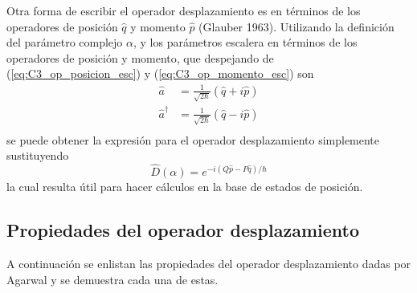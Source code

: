 Otra forma de escribir el operador desplazamiento es en términos de los operadores de posición $\hat{q}$ y momento $\hat{p}$ (Glauber 1963). Utilizando la definición del parámetro complejo $\alpha$, y los parámetros escalera en términos de los operadores de posición y momento, que despejando de (\ref{eq:C3_op_posicion_esc}) y (\ref{eq:C3_op_momento_esc}) son
\begin{align}
  \hat{a}           & = \frac{1}{\sqrt{2\hbar}}(\hat{q} + i\hat{p}) \\
  \hat{a}^{\dagger} & = \frac{1}{\sqrt{2\hbar}}(\hat{q} - i\hat{p}) \\
\end{align}
se puede obtener la expresión para el operador desplazamiento simplemente sustituyendo
\begin{equation}
  \hat{D}(\alpha) = e^{-i(Q\hat{p}-P\hat{q})/\hbar}
\end{equation}
la cual resulta útil para hacer cálculos en la base de estados de posición.
\subsection{Propiedades del operador desplazamiento}

A continuación se enlistan las propiedades del operador desplazamiento dadas por Agarwal \cite{Agarwal_2012} y se demuestra cada una de estas.

